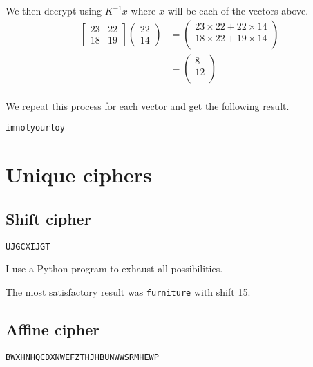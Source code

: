 \documentclass{article}
\begin{document}
We then decrypt using $K^{-1}x$ where $x$ will be each of the vectors above.
\begin{align*}
    \begin{bmatrix}
        23 & 22 \\
        18 & 19
    \end{bmatrix}
    \begin{pmatrix}
        22 \\ 14
    \end{pmatrix}
    &= 
    \begin{pmatrix}
        23\times22 + 22\times14 \\
        18\times22 + 19\times14 \\
    \end{pmatrix} \\
    &=
    \begin{pmatrix}
        8 \\
        12 \\
    \end{pmatrix} \\
\end{align*}

We repeat this process for each vector and get the following result.
\begin{verbatim}
imnotyourtoy
\end{verbatim}

\section{Unique ciphers}
\subsection{Shift cipher}
\begin{verbatim}
UJGCXIJGT
\end{verbatim}

I use a Python program to exhaust all possibilities.


The most satisfactory result was \texttt{furniture} with shift 15.

\subsection{Affine cipher}
\begin{verbatim}
BWXHNHQCDXNWEFZTHJHBUNWWSRMHEWP
\end{verbatim}
\end{document}
